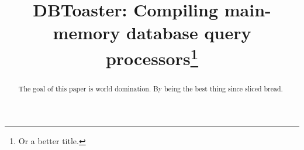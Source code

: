 \documentclass{vldb}
\title{DBToaster: Compiling main-memory database query processors\thanks{Or a better title.}}
\date{}
\begin{document}
\maketitle


\begin{abstract}
The goal of this paper is world domination. By being the best thing since
sliced bread.
\end{abstract}









\footnotesize{


}
\end{document}

